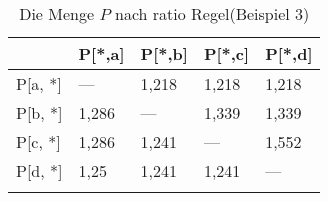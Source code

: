 \begin{longtable}[c]{|l|l|l|l|l|}
\hline
            & P{[}*,a{]} & P{[}*,b{]} & P{[}*,c{]} & P{[}*,d{]} \\ \hline
\endfirsthead
%
\endhead
%
P{[}a, *{]} & ---        & 1,218      & 1,218      & 1,218      \\ \hline
P{[}b, *{]} & 1,286      & ---        & 1,339      & 1,339      \\ \hline
P{[}c, *{]} & 1,286      & 1,241      & ---        & 1,552      \\ \hline
P{[}d, *{]} & 1,25       & 1,241      & 1,241      & ---        \\ \hline
\caption{Die Menge $P$ nach ratio Regel(Beispiel 3)}
\label{beispiel3ratio_p}\\
\end{longtable}
